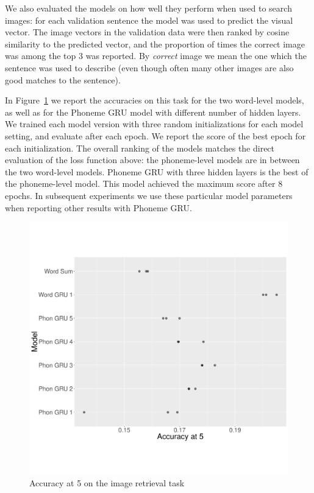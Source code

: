 We also evaluated the models on how well they perform when used to
search images: for each validation sentence the model was used to predict the
visual vector. The image vectors in the validation data were then
ranked by cosine similarity to the predicted vector, and the
proportion of times the correct image was among the top 3 was
reported. By {\it correct} image we mean the one which the sentence
was used to describe (even though often many other images are also
good matches to the sentence). 

In Figure~\ref{fig:accat5} we report the accuracies on this task for
the two word-level models, as well as for the Phoneme GRU model with
different number of hidden layers. We trained each model version with
three random initializations for each model setting, and evaluate
after each epoch. We report the score of the best epoch for each
initialization. The overall ranking of the models matches the direct
evaluation of the loss function above: the phoneme-level models are in
between the two word-level models. Phoneme GRU with three hidden
layers is the best of the phoneme-level model. This model achieved the
maximum score after 8 epochs. In subsequent experiments we use these
particular model parameters when reporting other results with {\sc
  Phoneme GRU}.

\begin{figure}
  \centering
  \includegraphics[scale=0.25]{accat5.pdf}
  \caption{Accuracy at 5 on the image retrieval task}
  \label{fig:accat5}
\end{figure}

